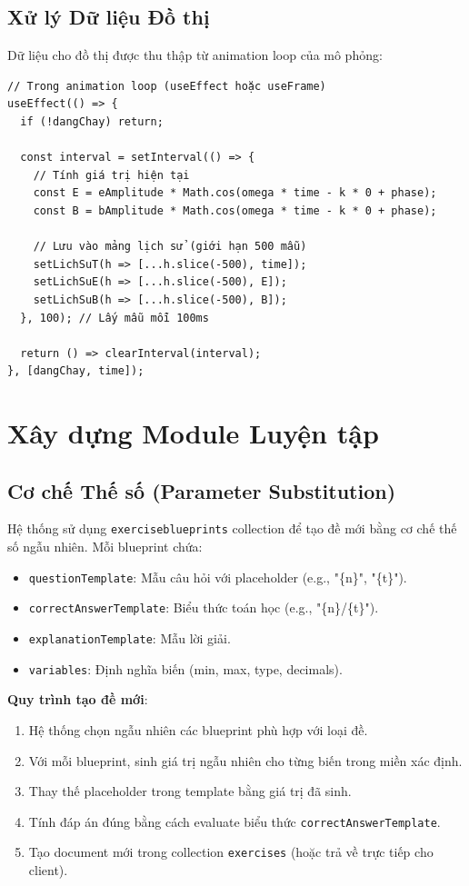 \subsection{Xử lý Dữ liệu Đồ thị}

Dữ liệu cho đồ thị được thu thập từ animation loop của mô phỏng:

\begin{verbatim}
// Trong animation loop (useEffect hoặc useFrame)
useEffect(() => {
  if (!dangChay) return;
  
  const interval = setInterval(() => {
    // Tính giá trị hiện tại
    const E = eAmplitude * Math.cos(omega * time - k * 0 + phase);
    const B = bAmplitude * Math.cos(omega * time - k * 0 + phase);
    
    // Lưu vào mảng lịch sử (giới hạn 500 mẫu)
    setLichSuT(h => [...h.slice(-500), time]);
    setLichSuE(h => [...h.slice(-500), E]);
    setLichSuB(h => [...h.slice(-500), B]);
  }, 100); // Lấy mẫu mỗi 100ms
  
  return () => clearInterval(interval);
}, [dangChay, time]);
\end{verbatim}

\section{Xây dựng Module Luyện tập}

\subsection{Cơ chế Thế số (Parameter Substitution)}

Hệ thống sử dụng \texttt{exerciseblueprints} collection để tạo đề mới bằng cơ chế thế số ngẫu nhiên. Mỗi blueprint chứa:

\begin{itemize}
    \item \texttt{questionTemplate}: Mẫu câu hỏi với placeholder (e.g., "\{n\}", "\{t\}").
    \item \texttt{correctAnswerTemplate}: Biểu thức toán học (e.g., "\{n\}/\{t\}").
    \item \texttt{explanationTemplate}: Mẫu lời giải.
    \item \texttt{variables}: Định nghĩa biến (min, max, type, decimals).
\end{itemize}

\textbf{Quy trình tạo đề mới}:

\begin{enumerate}
    \item Hệ thống chọn ngẫu nhiên các blueprint phù hợp với loại đề.
    \item Với mỗi blueprint, sinh giá trị ngẫu nhiên cho từng biến trong miền xác định.
    \item Thay thế placeholder trong template bằng giá trị đã sinh.
    \item Tính đáp án đúng bằng cách evaluate biểu thức \texttt{correctAnswerTemplate}.
    \item Tạo document mới trong collection \texttt{exercises} (hoặc trả về trực tiếp cho client).
\end{enumerate}

